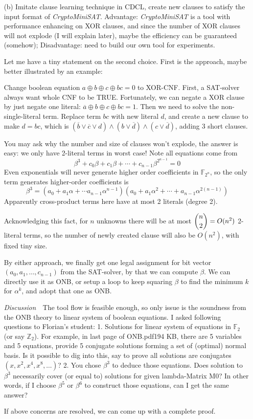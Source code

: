 \documentclass{acm_proc_article-sp}
\begin{document}
(b) Imitate clause learning technique in CDCL, create new clauses to satisfy the input format of \emph{CryptoMiniSAT}. Advantage: \emph{CryptoMiniSAT} is a tool with performance enhancing
on XOR clauses, and since the number of XOR clauses will not explode (I will explain later), maybe the efficiency can be guaranteed (somehow); Disadvantage: need to build our own tool for experiments.

Let me have a tiny statement on the second choice. First is the approach, maybe better illustrated by an example:
\begin{Example}
Change boolean equation $a\oplus b\oplus c \oplus bc = 0$ to XOR-CNF. First, a SAT-solver always want whole CNF to be TRUE. Fortunately, we can negate a XOR clause by just negate one literal:
$\overline{a}\oplus b\oplus c \oplus bc = 1$. Then we need to solve the non-single-literal term. Replace term $bc$ with new literal $d$, and create a new clause to make $d=bc$, which is
$(\overline{b}\lor\overline{c}\lor d)\land(b\lor\overline{d})\land(c\lor\overline{d})$, adding 3 short clauses.
\end{Example}
You may ask why the number and size of clauses won't explode, the answer is easy: we only have 2-literal terms in worst case! Note all equations come from 
$$\beta^3 + c_0\beta + c_1\beta + \cdots + c_{n-1}\beta^{2^{n-1}} = 0$$
Even exponentials will never generate higher order coefficients in $\mathbb{F}_{2^n}$, so the only term generates higher-order coefficients is
$$\beta^3 = (a_0+a_1\alpha + \cdots a_{n-1}\alpha^{n-1})(a_0+a_1\alpha^2+\cdots + a_{n-1}\alpha^{2(n-1)})$$
Apparently cross-product terms here have at most 2 literals (degree 2).

Acknowledging this fact, for $n$ unknowns there will be at most $\dbinom{n}{2} = O(n^2)$ 2-literal terms, so the number of newly created clause will also be $O(n^2)$, with fixed tiny size.

By either approach, we finally get one legal assignment for bit vector $(a_0,a_1,\dots,c_{n-1})$ from the SAT-solver, by that we can compute $\beta$. We can directly use it as ONB, or setup a loop to keep squaring 
$\beta$ to find the minimum $k$ for $\alpha^k$, and adopt that one as ONB.

\textit{Discussion}\ \ The tool flow is feasible enough, so only issue is the soundness from the ONB theory to linear system of boolean equations. I asked following questions to Florian's student:
1. Solutions for linear system of equations in $\mathbb{F}_2$ (or say $\mathbb{Z}_2$). For example, in last page of ONB.pdf194 KB, there are 5 variables and 5 equations, provide 5 conjugate solutions forming a set of (optimal) normal basis.
Is it possible to dig into this, say to prove all solutions are conjugates $(x, x^2, x^4, x^8, \dots)$?
2. You chose $\beta^3$ to deduce those equations. Does solution to $\beta^3$ necessarily cover (or equal to) solutions for given lambda-Matrix M0? In other words, if I choose $\beta^5$ or $\beta^6$ to construct those equations, can I get the same answer?

If above concerns are resolved, we can come up with a complete proof.
\balancecolumns
\end{document}
